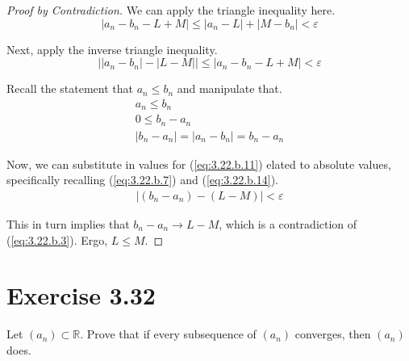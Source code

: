 \documentclass[12pt]{report}
\begin{document}
\begin{proof}[Proof by Contradiction]
            We can apply the triangle inequality here.
            \begin{equation}
                \label{eq:3.22.b.10}
                \left| a_n - b_n - L + M \right| \leq \left| a_n - L \right| + \left| M - b_n \right| < \varepsilon
            \end{equation}

            Next, apply the inverse triangle inequality.
            \begin{equation}
                \label{eq:3.22.b.11}
                \left| \left| a_n - b_n \right| - \left| L - M \right| \right| \leq \left| a_n - b_n - L + M \right| < \varepsilon
            \end{equation}

            Recall the statement that $a_n \leq b_n$ and manipulate that.
            \begin{gather}
                \label{eq:3.22.b.12}
                a_n \leq b_n\\
                \label{eq:3.22.b.13}
                0 \leq b_n - a_n\\
                \label{eq:3.22.b.14}
                \left| b_n - a_n \right| = \left| a_n - b_n \right| = b_n - a_n
            \end{gather}

            Now, we can substitute in values for (\ref{eq:3.22.b.11}) elated to absolute values, specifically recalling (\ref{eq:3.22.b.7}) and (\ref{eq:3.22.b.14}).
            \begin{gather}
                \label{eq:3.22.b.15}
                \left| (b_n - a_n) - (L - M) \right| < \varepsilon
            \end{gather}

            This in turn implies that $b_n - a_n \to L - M$, which is a contradiction of (\ref{eq:3.22.b.3}).
            Ergo, $L \leq M$. %
        \end{proof}
\pagebreak
\setcounter{section}{31}

\section{Exercise 3.32}
    Let $(a_n) \subset \mathbb{R}$.
    Prove that if every subsequence of $(a_n)$ converges, then $(a_n)$ does.
\end{document}
